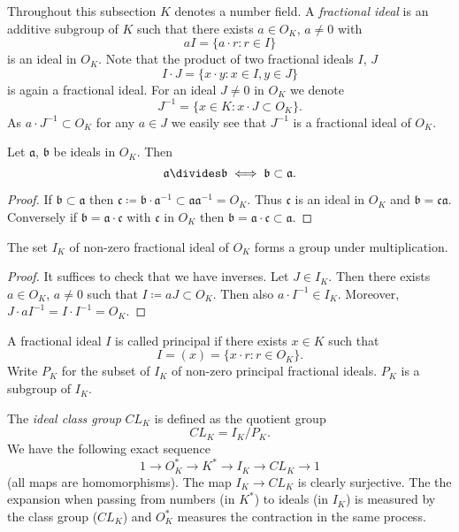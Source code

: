 \documentclass[NumTh.tex]{subfiles}
\begin{document}
Throughout this subsection $K$ denotes a number field.
A \emph{fractional ideal} is an additive subgroup of $K$ such that there exists $a \in O_K$, $a \neq 0$ with
\[ aI = \{ a \cdot r : r \in I \} \]
is an ideal in $O_K$.
Note that the product of two fractional ideals $I$, $J$
\[ I \cdot J = \{ x \cdot y : x \in I, y \in J \} \]
is again a fractional ideal.
For an ideal $J \neq 0$ in $O_K$ we denote
\[ J^{-1} = \{ x \in K : x \cdot J \subset O_K \} \text{.} \]
As $a \cdot J^{-1} \subset O_K$ for any $a \in J$ we easily see that $J^{-1}$ is a fractional ideal of $O_K$.

\begin{lemma}
  Let $\mathfrak{a}$, $\mathfrak{b}$ be ideals in $O_K$.
  Then 
  \[ \mathfrak{a} \divides \mathfrak{b} \iff \mathfrak{b} \subset \mathfrak{a} \text{.} \]
\end{lemma}

\begin{proof}
  If $\mathfrak{b} \subset \mathfrak{a}$ then $\mathfrak{c} \coloneq \mathfrak{b} \cdot \mathfrak{a}^{-1} \subset \mathfrak{a} \mathfrak{a}^{-1} = O_K$.
  Thus $\mathfrak{c}$ is an ideal in $O_K$ and $\mathfrak{b} = \mathfrak{c} \mathfrak{a}$.
  Conversely if $\mathfrak{b} = \mathfrak{a} \cdot \mathfrak{c}$ with $\mathfrak{c}$ in $O_K$ then $\mathfrak{b} = \mathfrak{a} \cdot \mathfrak{c} \subset \mathfrak{a}$.
\end{proof}

\begin{lemma}[3.4.2\label{l_3_4_2}]
  The set $I_K$ of non-zero fractional ideal of $O_K$ forms a group under multiplication.
\end{lemma}

\begin{proof}
  It suffices to check that we have inverses.
  Let $J \in I_K$.
  Then there exists $a \in O_K$, $a \neq 0$ such that $I \coloneq a J \subset O_K$.
  Then also $a \cdot I^{-1} \in I_K$.
  Moreover, $J \cdot a I^{-1} = I \cdot I^{-1} = O_K$.
\end{proof}

A fractional ideal $I$ is called principal if there exists $x \in K$ such that 
\[ I = (x) = \{ x \cdot r: r \in O_K \} \text{.} \]
Write $P_K$ for the subset of $I_K$ of non-zero principal fractional ideals.
$P_K$ is a subgroup of $I_K$.

The \emph{ideal class group} $CL_K$ is defined as the quotient group
\[ CL_K = I_K/P_K \text{.} \]
We have the following exact sequence
\[ 1 \to O_K^\ast \to K^\ast \to I_K \to CL_K \to 1 \]
(all maps are homomorphisms).
The map $I_K \to CL_K$ is clearly surjective.
The the expansion when passing from numbers (in $K^\ast$) to ideals (in $I_K$) is measured by the class group ($CL_K$)
and $O_K^\ast$ measures the contraction in the same process.
\end{document}
